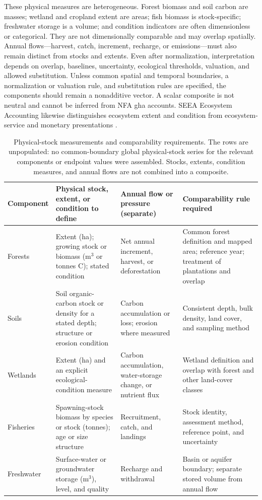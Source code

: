 \documentclass[11pt,a4paper]{article}
\begin{document}
These physical measures are heterogeneous. Forest biomass and soil carbon are masses; wetland and cropland extent are areas; fish biomass is stock-specific; freshwater storage is a volume; and condition indicators are often dimensionless or categorical. They are not dimensionally comparable and may overlap spatially. Annual flows—harvest, catch, increment, recharge, or emissions—must also remain distinct from stocks and extents. Even after normalization, interpretation depends on overlap, baselines, uncertainty, ecological thresholds, valuation, and allowed substitution. Unless common spatial and temporal boundaries, a normalization or valuation rule, and substitution rules are specified, the components should remain a nonadditive vector. A scalar composite is not neutral and cannot be inferred from NFA gha accounts. SEEA Ecosystem Accounting likewise distinguishes ecosystem extent and condition from ecosystem-service and monetary presentations \citep{UN2021SEEA_EA}.

\begin{table}[htbp]
\centering\footnotesize
\caption{Physical-stock measurements and comparability requirements. The rows are unpopulated: no common-boundary global physical-stock series for the relevant components or endpoint values were assembled. Stocks, extents, condition measures, and annual flows are not combined into a composite.}
\label{tab:si_stock_specification}
\begin{tabularx}{\textwidth}{@{}>{\raggedright\arraybackslash}p{} >{\raggedright\arraybackslash}p{} >{\raggedright\arraybackslash}p{} >{\raggedright\arraybackslash}X@{}}
\toprule
Component & Physical stock, extent, or condition to define & Annual flow or pressure (separate) & Comparability rule required \\
\midrule
Forests & Extent (ha); growing stock or biomass (m$^3$ or tonnes C); stated condition & Net annual increment, harvest, or deforestation & Common forest definition and mapped area; reference year; treatment of plantations and overlap \\
Soils & Soil organic-carbon stock or density for a stated depth; structure or erosion condition & Carbon accumulation or loss; erosion where measured & Consistent depth, bulk density, land cover, and sampling method \\
Wetlands & Extent (ha) and an explicit ecological-condition measure & Carbon accumulation, water-storage change, or nutrient flux & Wetland definition and overlap with forest and other land-cover classes \\
Fisheries & Spawning-stock biomass by species or stock (tonnes); age or size structure & Recruitment, catch, and landings & Stock identity, assessment method, reference point, and uncertainty \\
Freshwater & Surface-water or groundwater storage (m$^3$), level, and quality & Recharge and withdrawal & Basin or aquifer boundary; separate stored volume from annual flow \\
\bottomrule
\end{tabularx}
\end{table}
\end{document}
